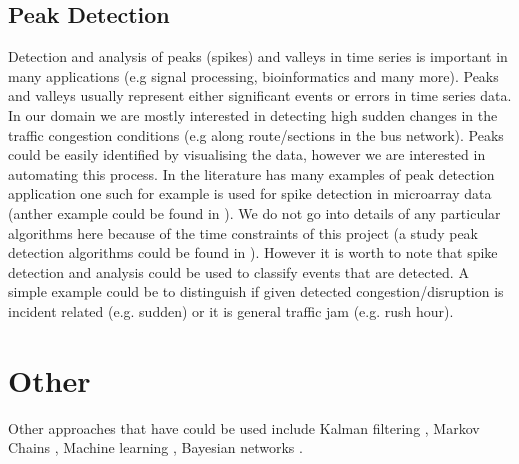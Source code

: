 \subsection{Peak Detection}
Detection and analysis of peaks (spikes) and valleys in time series is important in many applications (e.g signal processing, bioinformatics and many more). Peaks and valleys usually represent either significant events or errors in time series data. In our domain we are mostly interested in detecting high sudden changes in the traffic congestion conditions (e.g along route/sections in the bus network). Peaks could be easily identified by visualising the data, however we are interested in automating this process. In the literature has many examples of peak detection application one such for example is \cite{simplePeakDetection} used for spike detection in microarray data (anther example could be found in \cite{Azami2014491}). We do not go into details of any particular algorithms here because of the time constraints of this project (a study peak detection algorithms could be found in \cite{ventzas2011peak}). However it is worth to note that spike detection and analysis could be used to classify events that are detected. A simple example could be to distinguish if given detected congestion/disruption is incident related (e.g. sudden) or it is general traffic jam (e.g. rush hour).

\section{Other}
Other approaches that have could be used include Kalman filtering \cite{kalmanFiltering} \cite{Guo201450}, Markov Chains \cite{Qi201495} \cite{Ramezani20121576}, Machine learning \cite{herring2010real}, Bayesian networks \cite{Wang201479}. 




